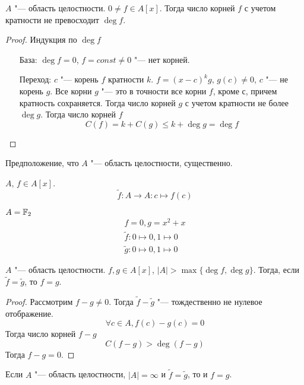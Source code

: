 \begin{theorem}{}
$A$ "--- область целостности. $0 \ne f \in A[x]$. Тогда число корней $f$ с учетом кратности не превосходит $\deg f$.
\end{theorem}
\begin{proof}
Индукция по $\deg f$
\begin{itemize}
\item[База:] 
$\deg f = 0$, $f = const \ne 0$ "--- нет корней.
\item[Переход:] 
$c$ "--- корень $f$ кратности $k$. $f = (x - c)^{k}g$, $g(c) \ne 0$, $c$ "--- не корень $g$.
Все корни $g$ "--- это в точности все корни $f$, кроме $с$, причем кратность сохраняется. Тогда число корней $g$ с учетом кратности не более $\deg g$. Тогда число корней $f$ 
\[ C(f) = k + C(g) \le k + \deg g = \deg f \]
\end{itemize}
\end{proof}

\begin{Rem}
Предположение, что $A$ "--- область целостности, существенно.
\end{Rem}

\begin{Def}
$A$, $f \in A[x]$.
\[ \tilde f\colon A \to A\colon c \mapsto f(c) \]
\end{Def}
\begin{exmp}
$A = \mathbb{F}_2$
\begin{gather*}
f = 0, g = x^2 + x \\
\tilde f\colon 0 \mapsto 0, 1 \mapsto 0 \\
\tilde g\colon 0 \mapsto 0, 1 \mapsto 0
\end{gather*}
\end{exmp}

\begin{conseq}
$A$ "--- область целостности. $f, g \in A[x]$, $|A| > \max\{\deg f, \deg g\}$.
Тогда, если $\tilde f = \tilde g$, то $f = g$.
\end{conseq}
\begin{proof}
Рассмотрим $f - g \ne 0$. Тогда $\tilde f - \tilde g$ "--- тождественно не нулевое отображение.
\[ \forall c \in A, f(c) - g(c) = 0 \]
Тогда число корней $f - g$
\[ C(f-g) > \deg (f - g) \]
Тогда $f - g = 0$.
\end{proof}

\begin{conseq}
Если $A$ "--- область целостности, $|A| = \infty$ и $\tilde f = \tilde g$, то и $f = g$.
\end{conseq}
